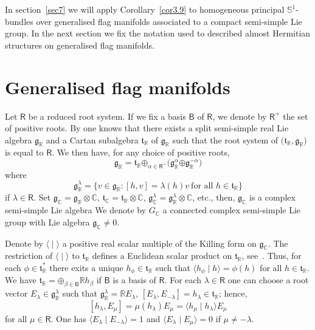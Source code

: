 \documentclass[a4paper,reqno]{amsart}
\theoremstyle{definition}
\theoremstyle{remark}
\theoremstyle{plain}
\numberwithin{equation}{section}
\newcommand{\C}{{\mathbb{C}}}
\newcommand{\R}{{\mathbb{R}}}
\newcommand{\bbS}{{\mathbb{S}}}
\newcommand{\g}{{\mathfrak{g}}}  %
\def\boplus{\mathbin{\boldsymbol{\oplus}}}
\newcommand{\ascal}[2]{{\langle {#1}  \mid {#2} \rangle}}
\newcommand{\gC}{{\mathfrak{g}_\C}}
\newcommand{\GC}{{G}_\C}
\newcommand{\groot}[1]{\g^{#1}_\C}
\newcommand{\grootR}[1]{\g^{#1}_\R}
\newcommand{\tC}{{\mathfrak{t}_\C}}
\newcommand{\tR}{{\mathfrak{t}_\R}}
\newcommand{\roots}{\mathsf{R}}
\newcommand{\proots}{\mathsf{R}^+}
\newcommand{\broots}{\mathsf{B}}
\begin{document}
In section~\ref{sec7} we will apply  Corollary~\ref{cor3.9} to  homogeneous principal
$\bbS^1$-bundles over generalised flag manifolds associated to a
compact semi-simple Lie group.  In the next section we fix the
notation used to described almost Hermitian structures on generalised flag manifolds.
    

    \section{Generalised flag manifolds} \label{sec6}

    Let $\roots$ be a
    reduced root system.  If we fix a basis $\broots$ of
    $\roots$, we denote by $\proots$ the set of positive roots.
    By \cite[Chapitre~8, \S~2 \& \S~4 Th\'eor\`eme~1]{Bou} one knows
    that there exists a split semi-simple real Lie algebra
    $\g_\R$ and a Cartan subalgebra $\tR$ of $\g_\R$ such that
    the root system of $\mathsf(\tR, \g_\R)$ is equal to
    $\roots$. We then have, for any choice of positive roots,
    $$\g_\R= \tR \boplus_{\alpha \in \proots} \bigl(\g_\R^{\alpha}
    \boplus \g_\R^{-\alpha} \bigr)$$
    where
    $$\g_\R^{\lambda} = \{v \in \g_\R : [h,v] = \lambda(h)v \ 
    \text{for all $h \in \tR$}\}$$ if $\lambda \in \roots$.
Set $\g_\C = \g_\R \otimes \C$, $\tC = \tR \otimes \C$,
$\groot{\lambda} = \g_\R^{\lambda} \otimes \C$, etc.,  then,
$\g_\C$ is a complex semi-simple Lie algebra %
We denote by $\GC$ a
connected complex semi-simple Lie group with Lie
algebra $\gC \ne 0$.

Denote by $\ascal{}{}$ a positive real scalar multiple of the
Killing form on $\gC$.  The restriction of $\ascal{}{}$ to $\tR$
defines a Euclidean scalar product on $\tR$,
see~\cite[Chapitre~8, \S~2, Remarque~2, p.~80]{Bou}.  Thus, for
each $\phi \in \mathfrak{t}^*_\R$ there exits a unique
$h_\phi \in \tR$ such that $ \ascal{h_\phi}{h} = \phi(h)$ for all
$h \in \tR$.  We have
$\tR= \boplus_{\beta \in \broots} \R h_\beta$ if $\broots$ is a
basis of $\roots$.  For each $\lambda \in \roots$ one can choose
a root vector $E_\lambda \in \grootR{\lambda}$ such that
$\grootR{\lambda} = \R E_\lambda$,
$[E_\lambda, E_{-\lambda}]= h_\lambda \in \tR$; hence,
$$[h_\lambda, E_{\mu}] = \mu(h_\lambda) E_\mu =
\ascal{h_\mu}{h_\lambda}E_\mu$$ for all $\mu \in \roots$.  One has
$\ascal{E_\lambda}{E_{-\lambda}} = 1$ and
$\ascal{E_\lambda}{E_{\mu}} = 0$ if $\mu \neq -\lambda$.
\end{document}
